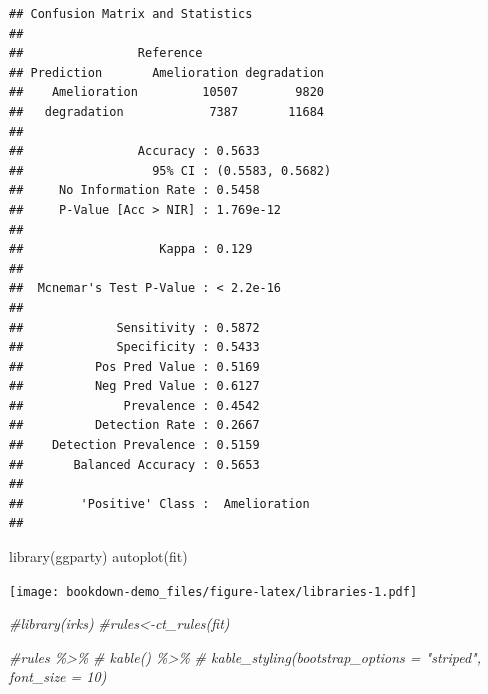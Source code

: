 \documentclass[
]{book}
\newenvironment{Shaded}{\begin{snugshade}}{\end{snugshade}}
\newcommand{\CommentTok}[1]{\textcolor[rgb]{0.56,0.35,0.01}{\textit{#1}}}
\newcommand{\FunctionTok}[1]{\textcolor[rgb]{0.00,0.00,0.00}{#1}}
\newcommand{\NormalTok}[1]{#1}
\newcommand{\OtherTok}[1]{\textcolor[rgb]{0.56,0.35,0.01}{#1}}
\newcommand{\SpecialCharTok}[1]{\textcolor[rgb]{0.00,0.00,0.00}{#1}}
\begin{document}
\begin{Shaded}
\end{Shaded}

\begin{verbatim}
## Confusion Matrix and Statistics
## 
##                Reference
## Prediction       Amelioration degradation
##    Amelioration         10507        9820
##   degradation            7387       11684
##                                           
##                Accuracy : 0.5633          
##                  95% CI : (0.5583, 0.5682)
##     No Information Rate : 0.5458          
##     P-Value [Acc > NIR] : 1.769e-12       
##                                           
##                   Kappa : 0.129           
##                                           
##  Mcnemar's Test P-Value : < 2.2e-16       
##                                           
##             Sensitivity : 0.5872          
##             Specificity : 0.5433          
##          Pos Pred Value : 0.5169          
##          Neg Pred Value : 0.6127          
##              Prevalence : 0.4542          
##          Detection Rate : 0.2667          
##    Detection Prevalence : 0.5159          
##       Balanced Accuracy : 0.5653          
##                                           
##        'Positive' Class :  Amelioration   
## 
\end{verbatim}

\begin{Shaded}
\begin{Highlighting}[]
\FunctionTok{library}\NormalTok{(ggparty)}
\FunctionTok{autoplot}\NormalTok{(fit)}
\end{Highlighting}
\end{Shaded}

\texttt{[image: bookdown-demo\_files/figure-latex/libraries-1.pdf]}

\begin{Shaded}
\begin{Highlighting}[]
\CommentTok{\#library(irks)}
\CommentTok{\#rules\textless{}{-}ct\_rules(fit)}

\CommentTok{\#rules \%\textgreater{}\% }
\CommentTok{\#  kable() \%\textgreater{}\%}
\CommentTok{\#  kable\_styling(bootstrap\_options = "striped", font\_size = 10)}
\end{Highlighting}
\end{Shaded}
\end{document}
